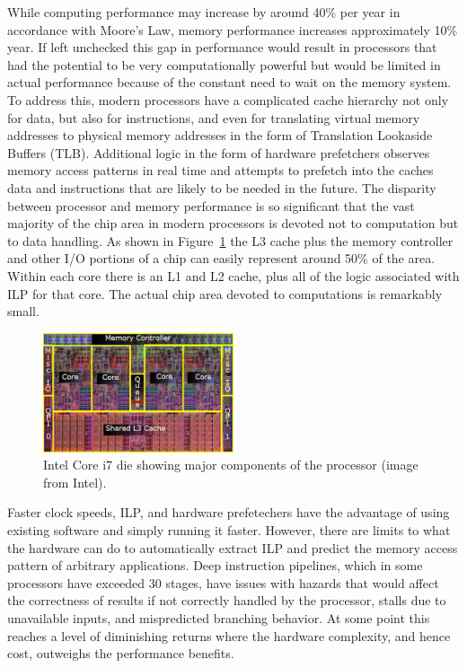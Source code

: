 \documentclass[preprint,sort&compress]{elsarticle}
\begin{document}
While computing performance may increase by around 40\% per year in accordance with Moore's Law, memory performance increases approximately 10\% year.  If left unchecked this gap in performance would result in processors that had the potential to be very computationally powerful but would be limited in actual performance because of the constant need to wait on the memory system.  To address this, modern processors have a complicated cache hierarchy not only for data, but also for instructions, and even for translating virtual memory addresses to physical memory addresses in the form of Translation Lookaside Buffers (TLB).  Additional logic in the form of hardware prefetchers observes memory access patterns in real time and attempts to prefetch into the caches data and instructions that are likely to be needed in the future.  The disparity between processor and memory performance is so significant that the vast majority of the chip area in modern processors is devoted not to computation but to data handling.  As shown in Figure~\ref{fig:core_i7_die} the L3 cache plus the memory controller and other I/O portions of a chip can easily represent around 50\% of the area.  Within each core there is an L1 and L2 cache, plus all of the logic associated with ILP for that core.  The actual chip area devoted to computations is remarkably small.

\begin{figure}[!Hhtb]
\begin{center}
\includegraphics[width=0.5\textwidth]{Core_i7_die.pdf}
\caption{Intel Core i7 die showing major components of the processor (image from Intel). \label{fig:core_i7_die}}
\end{center}
\end{figure}

Faster clock speeds, ILP, and hardware prefetechers have the advantage of using existing software and simply running it faster.  However, there are limits to what the hardware can do to automatically extract ILP and predict the memory access pattern of arbitrary applications.  Deep instruction pipelines, which in some processors have exceeded 30 stages, have issues with hazards that would affect the correctness of results if not correctly handled by the processor, stalls due to unavailable inputs, and mispredicted branching behavior.  At some point this reaches a level of diminishing returns where the hardware complexity, and hence cost, outweighs the performance benefits.
\end{document}
